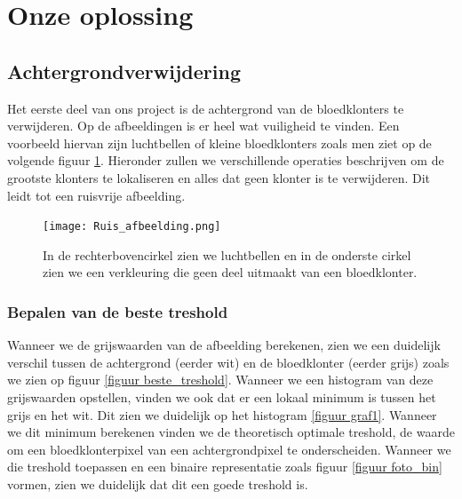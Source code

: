 \documentclass[a4paper,kulak]{kulakarticle}
\begin{document}
	\section{Onze oplossing}

		\subsection{Achtergrondverwijdering}
			Het eerste deel van ons project is de achtergrond van de bloedklonters te verwijderen. Op de afbeeldingen is er heel wat vuiligheid te vinden. Een voorbeeld hiervan zijn luchtbellen of kleine bloedklonters zoals men ziet op de volgende figuur \ref{figuur achtergrondverwijdering}. Hieronder zullen we verschillende operaties beschrijven om de grootste klonters te lokaliseren en alles dat geen klonter is te verwijderen. Dit leidt tot een ruisvrije afbeelding.

		\begin{figure}[H]
		\centering
		\texttt{[image: Ruis\_afbeelding.png]}
	
		\caption{In de rechterbovencirkel zien we luchtbellen en in de onderste cirkel zien we een verkleuring die geen deel uitmaakt van een bloedklonter.}
		\label{figuur achtergrondverwijdering}
		\end{figure}

	\subsubsection{Bepalen van de beste treshold}
		Wanneer we de grijswaarden van de afbeelding berekenen, zien we een duidelijk verschil tussen de achtergrond (eerder wit) en de bloedklonter (eerder grijs) zoals we zien op figuur \ref{figuur beste_treshold}. Wanneer we een histogram van deze grijswaarden opstellen, vinden we ook dat er een lokaal minimum is tussen het grijs en het wit. Dit zien we duidelijk op het histogram \ref{figuur graf1}. Wanneer we dit minimum berekenen vinden we de theoretisch optimale treshold, de waarde om een bloedklonterpixel van een achtergrondpixel te onderscheiden. Wanneer we die treshold toepassen en een binaire representatie zoals figuur \ref{figuur foto_bin} vormen, zien we duidelijk dat dit een goede treshold is.
\end{document}
